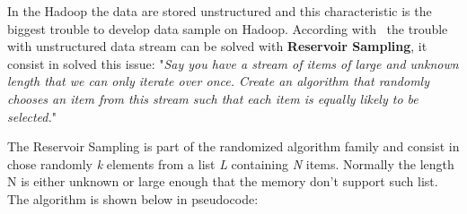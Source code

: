 In the Hadoop the data are stored unstructured and this characteristic is the
biggest trouble to develop data sample on Hadoop. According with~\cite{vitter:1985, cloudera, wikipedia:ReservoirSampling}
the trouble with unstructured data stream can be solved with {\bf Reservoir Sampling},
it consist in solved this issue: "{\it Say you have a stream of items of large
and unknown length that we can only iterate over once. Create an algorithm that
randomly chooses an item from this stream such that each item is equally likely
to be selected.}"

The Reservoir Sampling is part of the randomized algorithm family and consist in
chose randomly {\it k} elements from a list {\it L} containing {\it N} items. Normally
the length N is either unknown or large enough that the memory don't support such
list. The algorithm is shown below in pseudocode:



        

%
        



